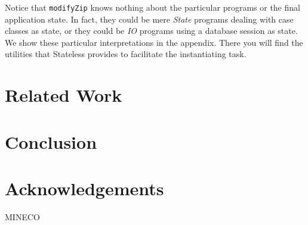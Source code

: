 \documentclass[preview, 3p]{elsarticle}
\begin{document}
Notice that \lstinline{modifyZip} knows nothing about the particular programs or
the final application state. In fact, they could be mere \emph{State} programs
dealing with case classes as state, or they could be \emph{IO} programs using a
database session as state. We show these particular interpretations in the
appendix. There you will find the utilities that Stateless provides to
facilitate the instantiating task.



\section{Related Work}
\label{sec:Discussion}

\section{Conclusion}



\section*{Acknowledgements}
MINECO

{}

\end{document}
